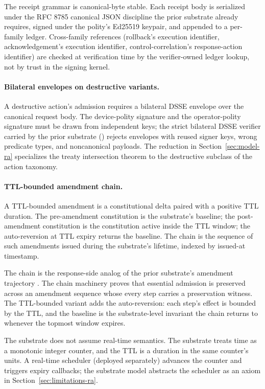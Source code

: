 The receipt grammar is canonical-byte stable. Each receipt body is
serialized under the RFC 8785 canonical JSON discipline the prior
substrate \cite{programmableSovereigntyAnonymous} already requires,
signed under the polity's Ed25519 keypair, and appended to a per-family
ledger. Cross-family references
(rollback's execution identifier, acknowledgement's execution
identifier, control-correlation's response-action identifier) are
checked at verification time by the verifier-owned ledger lookup, not
by trust in the signing kernel.

\paragraph{Bilateral envelopes on destructive variants.}
A destructive action's admission requires a bilateral DSSE envelope
over the canonical request body. The device-polity signature and the
operator-polity signature must be drawn from independent keys; the
strict bilateral DSSE verifier carried by the prior substrate
\cite{programmableSovereigntyAnonymous}
() rejects
envelopes with reused signer keys, wrong predicate types, and
noncanonical payloads. The reduction 
in Section~\ref{sec:model-ra} specializes the treaty intersection
theorem to the destructive subclass of the action taxonomy.

\paragraph{TTL-bounded amendment chain.}
A TTL-bounded amendment is a constitutional delta paired with a
positive TTL duration. The pre-amendment constitution is the
substrate's baseline; the post-amendment constitution is the
constitution active inside the TTL window; the auto-reversion at TTL
expiry returns the baseline. The chain is the sequence of such
amendments issued during the substrate's lifetime, indexed by
issued-at timestamp.

The chain is the response-side analog of the prior substrate's
amendment trajectory \cite{programmableSovereigntyAnonymous}. The chain
machinery  proves that essential
admission is preserved across an amendment sequence whose every step
carries a preservation witness. The TTL-bounded variant adds the auto-reversion:
each step's effect is bounded by the TTL, and the baseline is the
substrate-level invariant the chain returns to whenever the topmost
window expires.

The substrate does not assume real-time semantics. The substrate
treats time as a monotonic integer counter, and the TTL is a duration
in the same counter's units. A real-time scheduler (deployed
separately) advances the counter and triggers expiry callbacks; the
substrate model abstracts the scheduler as an axiom in
Section~\ref{sec:limitations-ra}.
